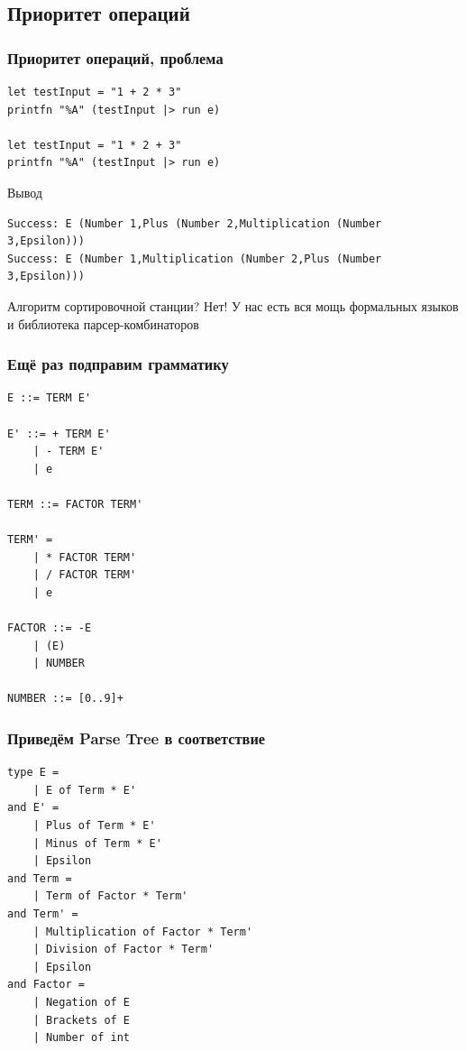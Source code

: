 \documentclass{../../slides-style}
\begin{document}
    \subsection{Приоритет операций}

    \begin{frame}[fragile]
        \frametitle{Приоритет операций, проблема}
        \begin{small}
            \begin{verbatim}
let testInput = "1 + 2 * 3"
printfn "%A" (testInput |> run e)

let testInput = "1 * 2 + 3"
printfn "%A" (testInput |> run e)
            \end{verbatim}

            \begin{exampleblock}{Вывод}
                \begin{verbatim}
Success: E (Number 1,Plus (Number 2,Multiplication (Number 3,Epsilon)))
Success: E (Number 1,Multiplication (Number 2,Plus (Number 3,Epsilon)))
                \end{verbatim}
            \end{exampleblock}
            Алгоритм сортировочной станции? Нет! У нас есть вся мощь формальных языков и библиотека парсер-комбинаторов
        \end{small}
    \end{frame}

    \begin{frame}[fragile]
        \frametitle{Ещё раз подправим грамматику}
        \begin{small}
            \begin{verbatim}
E ::= TERM E'

E' ::= + TERM E'
    | - TERM E'
    | e

TERM ::= FACTOR TERM'

TERM' = 
    | * FACTOR TERM'
    | / FACTOR TERM'
    | e

FACTOR ::= -E
    | (E)
    | NUMBER

NUMBER ::= [0..9]+
            \end{verbatim}
        \end{small}
    \end{frame}

    \begin{frame}[fragile]
        \frametitle{Приведём Parse Tree в соответствие}
        \begin{small}
            \begin{verbatim}
type E =
    | E of Term * E'
and E' =
    | Plus of Term * E'
    | Minus of Term * E'
    | Epsilon
and Term = 
    | Term of Factor * Term'
and Term' =
    | Multiplication of Factor * Term'
    | Division of Factor * Term'
    | Epsilon
and Factor =
    | Negation of E
    | Brackets of E
    | Number of int
            \end{verbatim}
        \end{small}
    \end{frame}
\end{document}
